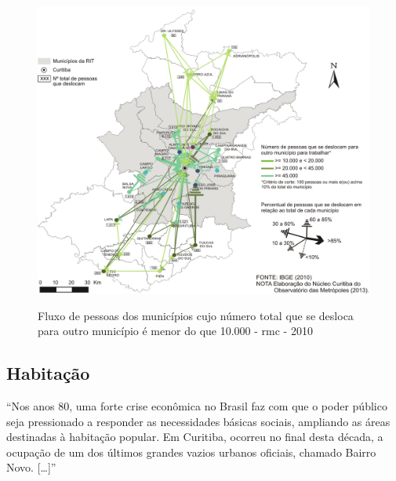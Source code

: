	\begin{figure}
		\centering
		\caption{Fluxo de pessoas dos municípios cujo número total que se desloca para outro município é menor do que 10.000 - \gls{rmc} - 2010}
		\includegraphics[width=0.7\linewidth]{img/paese2014a_02}
		\label{fig:paese2014a02}
	\end{figure}
	
	\subsection{Habitação}
	
	\begin{citacao}
		``Nos anos 80, uma forte crise econômica no Brasil faz com que o poder público seja pressionado a responder as necessidades básicas sociais, ampliando as áreas destinadas à habitação popular. Em Curitiba, ocorreu no final desta década, a ocupação de um dos últimos grandes vazios urbanos oficiais, chamado Bairro Novo. [\dots]'' \cite[p. 54]{castro2005a}
	\end{citacao}
	

